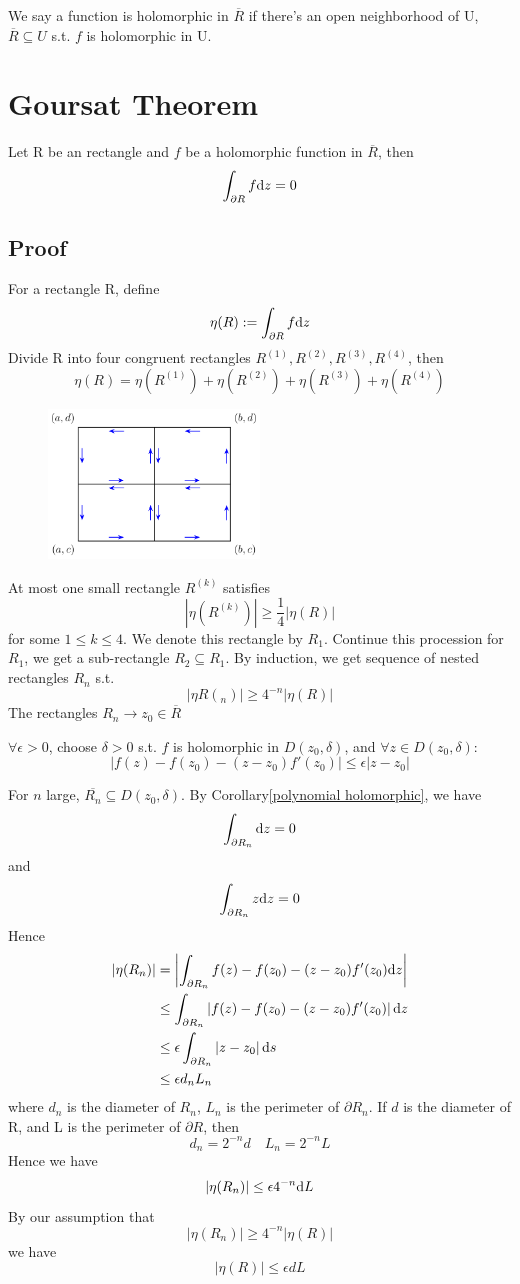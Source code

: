 \documentclass{book}
\newcommand{\abs}[1]{\left\lvert #1 \right\rvert}
\begin{document}
We say a function is holomorphic in $\overline R$ if there's an open neighborhood of U, $\overline R\subseteq U$ s.t. $f$ is holomorphic in U.

\section{Goursat Theorem}
\label{Goursat Theorem}
Let R be an rectangle and $f$ be a holomorphic function in $\overline R$, then $$\int_{\partial R}f\text dz=0$$
\subsection*{Proof}
For a rectangle R, define $$\eta(R):=\int_{\partial R}f\text dz$$
Divide R into four congruent rectangles $R^{(1)},R^{(2)},R^{(3)},R^{(4)}$, then 
$$\eta(R)=\eta(R^{(1)})+\eta(R^{(2)})+\eta(R^{(3)})+\eta(R^{(4)})$$
\begin{figure}[h]
    \centering
    \includegraphics[width=0.5\textwidth]{figure/2.png}
\end{figure}

At most one small rectangle $R^{(k)}$ satisfies $$\abs{\eta(R^{(k)})}\geq \frac{1}4\abs{\eta(R)}$$
for some $1\leq k\leq 4$. We denote this rectangle by $R_1$. Continue this procession for $R_1$, we get a sub-rectangle $R_2\subseteq R_1$. By induction, we get sequence of nested rectangles $R_n$ s.t. $$\abs{\eta R(_n)}\geq 4^{-n}\abs{\eta(R)}$$
The rectangles $R_n\to z_0\in \overline R$

$\forall \epsilon>0$, choose $\delta>0$ s.t. $f$ is holomorphic in $D(z_0,\delta)$, and $\forall z\in D(z_0,\delta)$:
$$\abs{f(z)-f(z_0)-(z-z_0)f'(z_0)}\leq\epsilon\abs{z-z_0}$$

For $n$ large, $\overline {R_n}\subseteq D(z_0,\delta)$. By Corollary\ref{polynomial holomorphic}, we have
$$\int_{\partial {R_n}}\text dz=0$$
and $$\int_{\partial R_n}z\text dz=0$$
Hence
$$\begin{aligned}
    \abs{\eta(R_n)} &=\abs{\int_{\partial R_n}f(z)-f(z_0)-(z-z_0)f'(z_0)\text dz}\\
    &\leq \int_{\partial R_n}\abs{f(z)-f(z_0)-(z-z_0)f'(z_0)}\text dz\\
    &\leq \epsilon\int_{\partial R_n}\abs{z-z_0}\text ds\\
    &\leq \epsilon d_nL_n
\end{aligned}$$
where $d_n$ is the diameter of $R_n$, $L_n$ is the perimeter of $\partial R_n$. If $d$ is the diameter of R, and L is the perimeter of $\partial R$, then $$d_n=2^{-n}d\quad L_n=2^{-n}L$$
Hence we have
$$\abs{\eta(R_n)}\leq \epsilon 4^{-n}\text dL$$
By our assumption that $$\abs{\eta(R_n)}\geq 4^{-n}\abs{\eta(R)}$$
we have
$$\abs{\eta(R)}\leq \epsilon dL$$
\end{document}
